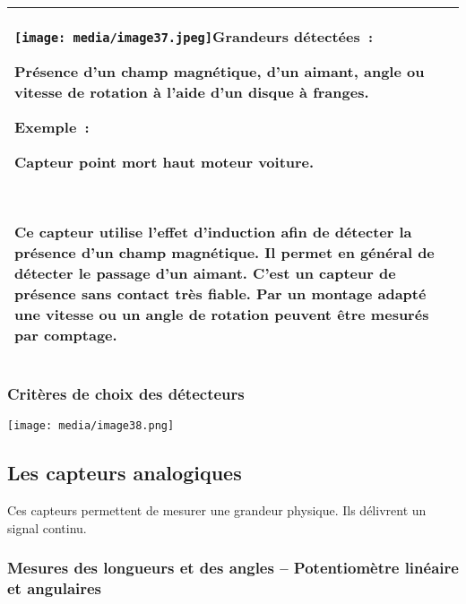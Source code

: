 \documentclass[
]{article}
\begin{document}
\begin{longtable}[]{@{}
  >{\raggedright\arraybackslash}p{}@{}}
\toprule
\endhead
\texttt{[image: media/image37.jpeg]}\textbf{Grandeurs
détectées~:}

Présence d'un champ magnétique, d'un aimant, angle ou vitesse de
rotation à l'aide d'un disque à franges.

\textbf{Exemple~:}

Capteur point mort haut moteur voiture.~

\textbf{~}

Ce capteur utilise l'effet d'induction afin de détecter la présence d'un
champ magnétique. Il permet en général de détecter le passage d'un
aimant. C'est un capteur de présence sans contact très fiable. Par un
montage adapté une vitesse ou un angle de rotation peuvent être mesurés
par comptage. \\
\bottomrule
\end{longtable}

\hypertarget{crituxe8res-de-choix-des-duxe9tecteurs}{%
\subsubsection{Critères de choix des
détecteurs}\label{crituxe8res-de-choix-des-duxe9tecteurs}}

\texttt{[image: media/image38.png]}

\hypertarget{les-capteurs-analogiques}{%
\subsection{Les capteurs analogiques}\label{les-capteurs-analogiques}}

Ces capteurs permettent de mesurer une grandeur physique. Ils délivrent
un signal continu.

\hypertarget{mesures-des-longueurs-et-des-angles-potentiomuxe8tre-linuxe9aire-et-angulaires}{%
\subsubsection{Mesures des longueurs et des angles -- Potentiomètre
linéaire et
angulaires}\label{mesures-des-longueurs-et-des-angles-potentiomuxe8tre-linuxe9aire-et-angulaires}}
\end{document}

